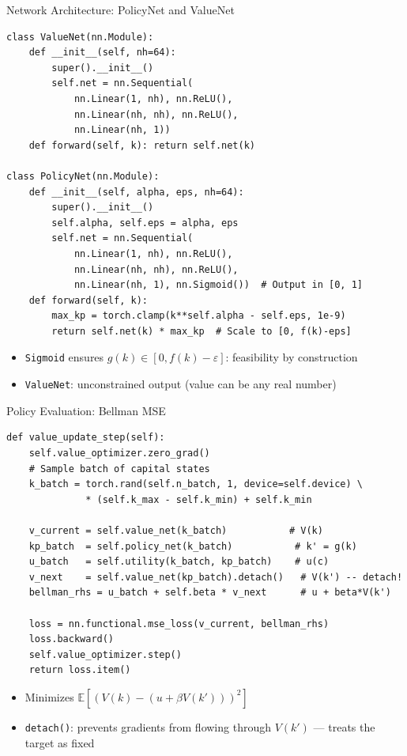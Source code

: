 \documentclass[10pt,english,aspectratio=169]{beamer}
\begin{document}
\begin{frame}[fragile]{Network Architecture: PolicyNet and ValueNet}
\vspace{-0.3cm}
\begin{lstlisting}[style=pythonstyle,basicstyle=\ttfamily\tiny]
class ValueNet(nn.Module):
    def __init__(self, nh=64):
        super().__init__()
        self.net = nn.Sequential(
            nn.Linear(1, nh), nn.ReLU(),
            nn.Linear(nh, nh), nn.ReLU(),
            nn.Linear(nh, 1))
    def forward(self, k): return self.net(k)

class PolicyNet(nn.Module):
    def __init__(self, alpha, eps, nh=64):
        super().__init__()
        self.alpha, self.eps = alpha, eps
        self.net = nn.Sequential(
            nn.Linear(1, nh), nn.ReLU(),
            nn.Linear(nh, nh), nn.ReLU(),
            nn.Linear(nh, 1), nn.Sigmoid())  # Output in [0, 1]
    def forward(self, k):
        max_kp = torch.clamp(k**self.alpha - self.eps, 1e-9)
        return self.net(k) * max_kp  # Scale to [0, f(k)-eps]
\end{lstlisting}
\vspace{-0.3cm}
\begin{itemize}
  \item \texttt{Sigmoid} ensures $g(k) \in [0, f(k) - \varepsilon]$: feasibility by construction
  \item \texttt{ValueNet}: unconstrained output (value can be any real number)
\end{itemize}
\end{frame}

\begin{frame}[fragile]{Policy Evaluation: Bellman MSE}
\vspace{-0.3cm}
\begin{lstlisting}[style=pythonstyle,basicstyle=\ttfamily\tiny]
def value_update_step(self):
    self.value_optimizer.zero_grad()
    # Sample batch of capital states
    k_batch = torch.rand(self.n_batch, 1, device=self.device) \
              * (self.k_max - self.k_min) + self.k_min

    v_current = self.value_net(k_batch)           # V(k)
    kp_batch  = self.policy_net(k_batch)           # k' = g(k)
    u_batch   = self.utility(k_batch, kp_batch)    # u(c)
    v_next    = self.value_net(kp_batch).detach()   # V(k') -- detach!
    bellman_rhs = u_batch + self.beta * v_next      # u + beta*V(k')

    loss = nn.functional.mse_loss(v_current, bellman_rhs)
    loss.backward()
    self.value_optimizer.step()
    return loss.item()
\end{lstlisting}
\vspace{-0.3cm}
\begin{itemize}
  \item Minimizes $\mathbb{E}[(V(k) - (u + \beta V(k')))^2]$
  \item \texttt{detach()}: prevents gradients from flowing through $V(k')$ --- treats the target as fixed
\end{itemize}
\end{frame}
\end{document}
